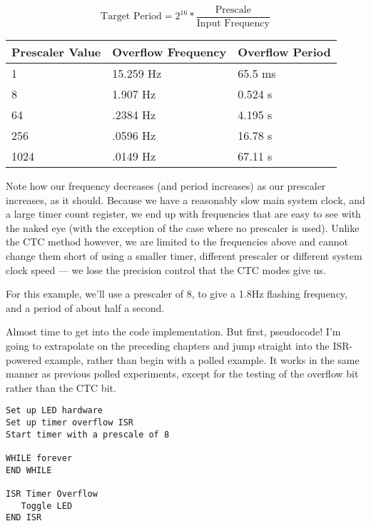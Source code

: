 \documentclass[a4paper,oneside,notitlepage]{book}
\begin{document}
\begin{displaymath}
\text{Target Period} = 2^{16} * \frac{\text{Prescale}}{\text{Input Frequency}}
\end{displaymath}

\begin{center}
\begin{tabular}{|l|l|l|}
	\hline
	Prescaler Value & Overflow Frequency & Overflow Period  \\
	\hline
	1    & 15.259 Hz & 65.5 ms \\
	8    & 1.907 Hz  & 0.524 s \\
	64   & .2384 Hz  & 4.195 s \\
	256  & .0596 Hz  & 16.78 s \\
	1024 & .0149 Hz  & 67.11 s \\
	\hline
\end{tabular}
\end{center}

Note how our frequency decreases (and period increases) as our prescaler increases, as it should. Because we have a reasonably slow main system clock, and a large timer count register, we end up with frequencies that are easy to see with the naked eye (with the exception of the case where no prescaler is used). Unlike the CTC method however, we are limited to the frequencies above and cannot change them short of using a smaller timer, different prescaler or different system clock speed --- we lose the precision control that the CTC modes give us.

For this example, we'll use a prescaler of 8, to give a 1.8Hz flashing frequency, and a period of about half a second.

Almost time to get into the code implementation. But first, pseudocode! I'm going to extrapolate on the preceding chapters and jump straight into the ISR-powered example, rather than begin with a polled example. It works in the same manner as previous polled experiments, except for the testing of the overflow bit rather than the CTC bit. 

\begin{center}
\begin{lstlisting}[keywordstyle=\color{black},commentstyle=\color{black}]
Set up LED hardware
Set up timer overflow ISR
Start timer with a prescale of 8

WHILE forever
END WHILE

ISR Timer Overflow
   Toggle LED
END ISR 
\end{lstlisting}
\end{center}
\end{document}
